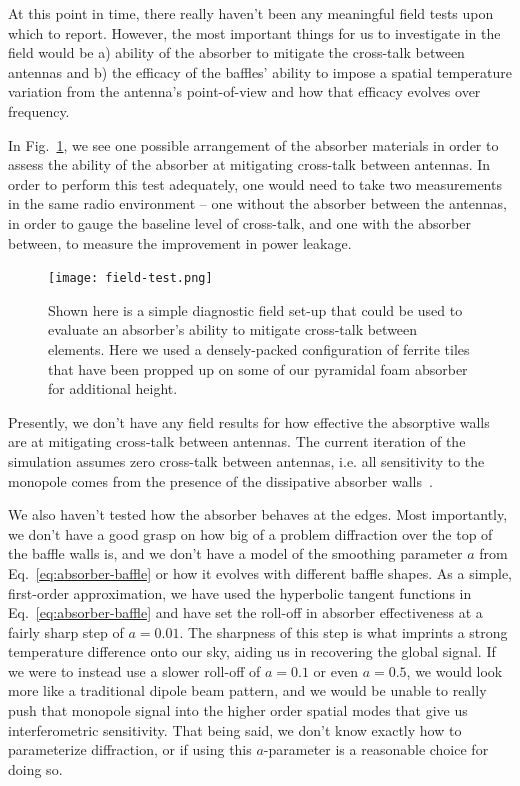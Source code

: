 At this point in time, there really haven't been any meaningful field tests 
upon which to report. However, the most important things for us to investigate 
in the field would be a) ability of the absorber to mitigate the cross-talk 
between antennas and b) the efficacy of the baffles' ability to impose a 
spatial temperature variation from the antenna's point-of-view and how that 
efficacy evolves over frequency.

In Fig.~\ref{fig:field-test}, we see one possible arrangement of the absorber 
materials in order to assess the ability of the absorber at mitigating 
cross-talk between antennas. In order to perform this test adequately, one 
would need to take two measurements in the same radio environment -- one 
without the absorber between the antennas, in order to gauge the baseline level 
of cross-talk, and one with the absorber between, to measure the improvement in 
power leakage.

\begin{figure}
    \begin{center}
    \texttt{[image: field-test.png]}
    \end{center}
    \caption{
        Shown here is a simple diagnostic field set-up that could be used to 
        evaluate an absorber's ability to mitigate cross-talk between elements.  
        Here we used a densely-packed configuration of ferrite tiles that have 
        been propped up on some of our pyramidal foam absorber for additional 
        height.
    }
    \label{fig:field-test}
\end{figure}

Presently, we don't have any field results for how effective the absorptive 
walls are at mitigating cross-talk between antennas. The current iteration of 
the simulation assumes zero cross-talk between antennas, i.e. all sensitivity 
to the monopole comes from the presence of the dissipative absorber 
walls~\citep{venumadhav2016}.

We also haven't tested how the absorber behaves at the edges. Most importantly, 
we don't have a good grasp on how big of a problem diffraction over the top of 
the baffle walls is, and we don't have a model of the smoothing parameter $a$ 
from Eq.~\eqref{eq:absorber-baffle} or how it evolves with different baffle 
shapes. As a simple, first-order approximation, we have used the hyperbolic 
tangent functions in Eq.~\eqref{eq:absorber-baffle} and have set the roll-off 
in absorber effectiveness at a fairly sharp step of $a = 0.01$. The sharpness 
of this step is what imprints a strong temperature difference onto our sky, 
aiding us in recovering the global signal. If we were to instead use a slower 
roll-off of $a = 0.1$ or even $a = 0.5$, we would look more like a traditional 
dipole beam pattern, and we would be unable to really push that monopole signal 
into the higher order spatial modes that give us interferometric sensitivity. 
That being said, we don't know exactly how to parameterize diffraction, or if 
using this $a$-parameter is a reasonable choice for doing so. 


